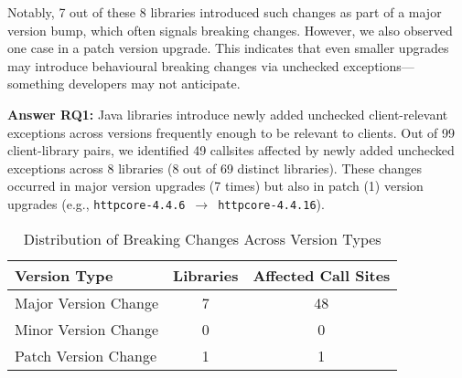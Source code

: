 Notably, 7 out of these 8 libraries introduced such changes as part of a major version bump, which often signals breaking changes. However, we also observed one case in a patch version upgrade. This indicates that even smaller upgrades may introduce behavioural breaking changes via unchecked exceptions—something developers may not anticipate.

\vspace{1em}
\begin{tcolorbox}[colback=gray!10, colframe=black]
\textbf{Answer RQ1:} Java libraries introduce newly added unchecked client-relevant exceptions across versions frequently enough to be relevant to clients. Out of 99 client-library pairs, we identified 49 callsites affected by newly added unchecked exceptions across 8 libraries (8 out of 69 distinct libraries). These changes occurred in major version upgrades (7 times) but also in patch (1) version upgrades (e.g., \texttt{httpcore-4.4.6}~$\rightarrow$~\texttt{httpcore-4.4.16}).
\end{tcolorbox}
\vspace{1em}

\begin{table}[h]
\centering
\caption{Distribution of Breaking Changes Across Version Types}
\label{tab:version-distribution}
\begin{tabular}{lcc}
\toprule
\textbf{Version Type} & \textbf{Libraries} & \textbf{Affected Call Sites} \\
\midrule
Major Version Change & 7 & 48 \\
Minor Version Change & 0 & 0 \\
Patch Version Change & 1 & 1 \\
\bottomrule
\end{tabular}
\end{table}

